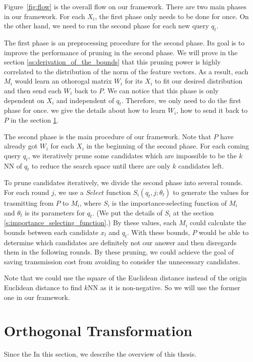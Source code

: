 Figure~\ref{fig:flow} is the overall flow on our framework.  There are two main phases in our framework.  For each $X_i$, the first phase only needs to be done for once.  On the other hand, we need to run the second phase for each new query $q_t$.

The first phase is an preprocessing procedure for the second phase. Its goal is to improve the performance of pruning in the second phase.  We will prove in the section \ref{ss:derivation_of_the_bounds} that this pruning power is highly correlated to the distribution of the norm of the feature vectors. As a result, each $M_i$ would learn an othorogal matrix $W_i$ for its $X_i$ to fit our desired distribution and then send each $W_i$ back to $P$.  We can notice that this phase is only dependent on $X_i$ and independent of $q_t$.  Therefore, we only need to do the first phase for once.  we give the details about how to learn $W_i$, how to send it back to $P$ in the section \ref{s:orthogonal}.

The second phase is the main procedure of our framework.  Note that $P$ have already got $W_i$ for each $X_i$ in the beginning of the second phase. For each coming query $q_t$, we iteratively prune some candidates which are impossible to be the $k$NN of $q_t$ to reduce the search space until there are only $k$ candidates left.

To prune candidates iteratively, we divide the second phase into several rounds.  For each round $j$, we use a $Select$ function $S_i(q_t,j;\theta_t)$ to generate the values for trasmitting from $P$ to $M_i$, where $S_i$ is the importance-selecting function of $M_i$ and $\theta_t$ is its parameters for $q_t$.  (We put the details of $S_i$ at the section \ref{s:importance_selecting_function}.)  By these values, each $M_i$ could calculate the bounds between each candidate $x_l$ and $q_t$.  With these bounds, $P$ would be able to determine which candidates are definitely not our answer and then disregards them in the following rounds.  By these pruning, we could achieve the goal of saving transmission cost from avoiding to consider the unnecessary candidates.

Note that we could use the square of the Euclidean distance instead of the origin Euclidean distance to find $k$NN as it is non-negative.  So we will use the former one in our framework.

\section{Orthogonal Transformation}
\label{s:orthogonal}
Since the In this section, we describe the overview of this thesis.


